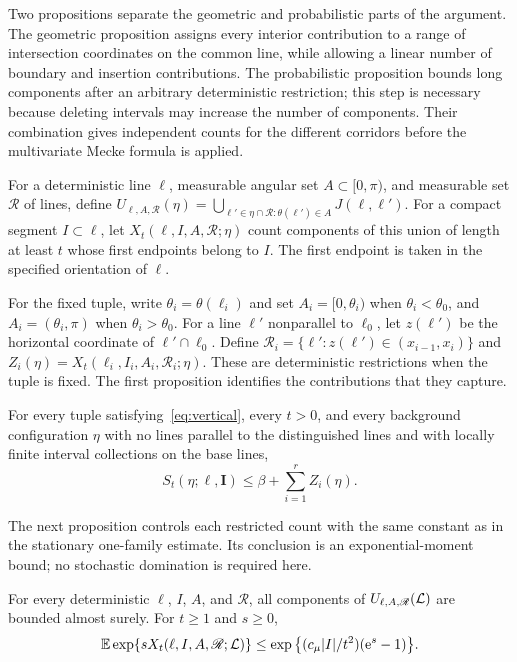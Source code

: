 \documentclass[11pt,letterpaper]{article}
\begin{document}
Two propositions separate the geometric and probabilistic parts of the argument. The geometric proposition assigns every interior contribution to a range of intersection coordinates on the common line, while allowing a linear number of boundary and insertion contributions. The probabilistic proposition bounds long components after an arbitrary deterministic restriction; this step is necessary because deleting intervals may increase the number of components. Their combination gives independent counts for the different corridors before the multivariate Mecke formula is applied.

For a deterministic line $\ell$, measurable angular set $A\subset[0,\pi)$, and measurable set $\mathscr R$ of lines, define $U_{\ell,A,\mathscr R}(\eta)=\bigcup_{\ell'\in\eta\cap\mathscr R:\theta(\ell')\in A}J(\ell,\ell')$. For a compact segment $I\subset\ell$, let $X_t(\ell,I,A,\mathscr R;\eta)$ count components of this union of length at least $t$ whose first endpoints belong to $I$. The first endpoint is taken in the specified orientation of $\ell$.

For the fixed tuple, write $\theta_i=\theta(\ell_i)$ and set $A_i=[0,\theta_i)$ when $\theta_i<\theta_0$, and $A_i=(\theta_i,\pi)$ when $\theta_i>\theta_0$. For a line $\ell'$ nonparallel to $\ell_0$, let $z(\ell')$ be the horizontal coordinate of $\ell'\cap\ell_0$. Define $\mathscr R_i=\{\ell':z(\ell')\in(x_{i-1},x_i)\}$ and $Z_i(\eta)=X_t(\ell_i,I_i,A_i,\mathscr R_i;\eta)$. These are deterministic restrictions when the tuple is fixed. The first proposition identifies the contributions that they capture.

\begin{proposition}\label{prop:geometry}
For every tuple satisfying~\eqref{eq:vertical}, every $t>0$, and every background configuration $\eta$ with no lines parallel to the distinguished lines and with locally finite interval collections on the base lines,
\begin{equation}\label{eq:transfer}
 S_t(\eta;\boldsymbol\ell,\boldsymbol I)
       \le\beta+\sum_{i=1}^r Z_i(\eta).
\end{equation}
\end{proposition}

The next proposition controls each restricted count with the same constant as in the stationary one-family estimate. Its conclusion is an exponential-moment bound; no stochastic domination is required here.

\begin{proposition}\label{prop:restriction}
For every deterministic $\ell$, $I$, $A$, and $\mathscr R$, all components of $U_{\ell,A,\mathscr R}(\mathcal L)$ are bounded almost surely. For $t\ge1$ and $s\ge0$,
\begin{equation}\label{eq:restriction}
 \mathbb E\exp\{sX_t(\ell,I,A,\mathscr R;\mathcal L)\}
 \le\exp\big\{(c_\mu|I|/t^2)(\mathrm{e}^s-1)\big\}.
\end{equation}
\end{proposition}
\end{document}
